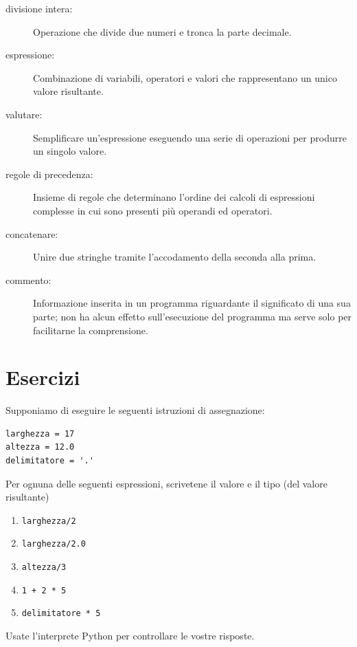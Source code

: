 \documentclass[10pt]{book}
\begin{document}
\begin{description}
\item[divisione intera:] Operazione che divide due numeri e tronca la parte decimale.

\item[espressione:]  Combinazione di variabili, operatori e valori che rappresentano un unico valore risultante.

\item[valutare:]  Semplificare un'espressione eseguendo una serie di operazioni per produrre un singolo valore.

\item[regole di precedenza:]  Insieme di regole che determinano l'ordine dei calcoli di espressioni complesse in cui sono presenti più operandi ed operatori.

\item[concatenare:]  Unire due stringhe tramite l'accodamento della seconda alla prima.

\item[commento:]  Informazione inserita in un programma riguardante il significato di una sua parte; non ha alcun effetto sull'esecuzione del programma
ma serve solo per facilitarne la comprensione.

\end{description}


\section{Esercizi}

\begin{exercise}

Supponiamo di eseguire le seguenti istruzioni di assegnazione:

\begin{verbatim}
larghezza = 17
altezza = 12.0
delimitatore = '.'
\end{verbatim}

Per ognuna delle seguenti espressioni, scrivetene il valore e il tipo (del valore risultante)

\begin{enumerate}

\item {\tt larghezza/2}

\item {\tt larghezza/2.0}

\item {\tt altezza/3}

\item {\tt 1 + 2 * 5}

\item {\tt delimitatore * 5}

\end{enumerate}

Usate l'interprete Python per controllare le vostre risposte.
\end{exercise}
\end{document}
